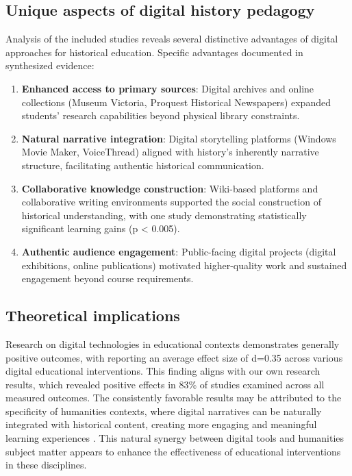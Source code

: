 \documentclass[
hf,
]{ceurart}
\begin{document}
\subsection{Unique aspects of digital history pedagogy}

Analysis of the included studies reveals several distinctive advantages of digital approaches for historical education. Specific advantages documented in synthesized evidence:
\begin{enumerate}
    \item \textbf{Enhanced access to primary sources}: Digital archives and online collections (Museum Victoria, Proquest Historical Newspapers) expanded students' research capabilities beyond physical library constraints.
    \item \textbf{Natural narrative integration}: Digital storytelling platforms (Windows Movie Maker, VoiceThread) aligned with history's inherently narrative structure, facilitating authentic historical communication.
    \item \textbf{Collaborative knowledge construction}: Wiki-based platforms and collaborative writing environments supported the social construction of historical understanding, with one study demonstrating statistically significant learning gains (p < 0.005).
    \item \textbf{Authentic audience engagement}: Public-facing digital projects (digital exhibitions, online publications) motivated higher-quality work and sustained engagement beyond course requirements.
\end{enumerate}

\subsection{Theoretical implications}


Research on digital technologies in educational contexts demonstrates generally positive outcomes, with \cite{tamim2011} reporting an average effect size of d=0.35 across various digital educational interventions. This finding aligns with our own research results, which revealed positive effects in 83\% of studies examined across all measured outcomes. The consistently favorable results may be attributed to the specificity of humanities contexts, where digital narratives can be naturally integrated with historical content, creating more engaging and meaningful learning experiences \cite{Crymble2021}. This natural synergy between digital tools and humanities subject matter appears to enhance the effectiveness of educational interventions in these disciplines.
\end{document}
